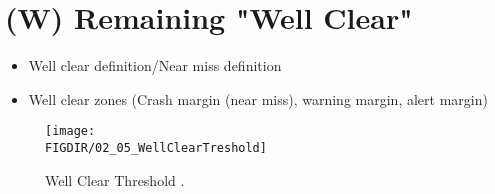\section{(W) Remaining "Well Clear"}\label{sec:WellClear}
    \begin{itemize}
        \item Well clear definition/Near miss definition
        \item Well clear zones (Crash margin (near miss), warning margin, alert margin)
    \end{itemize}
    \begin{figure}[H]
        \centering
        \texttt{[image: \\FIGDIR/02\_05\_WellClearTreshold]}
        \caption{Well Clear Threshold \cite{valavanis2015uav,united1983pilots}.}
        \label{fig:WellClearTreshold}
    \end{figure}
